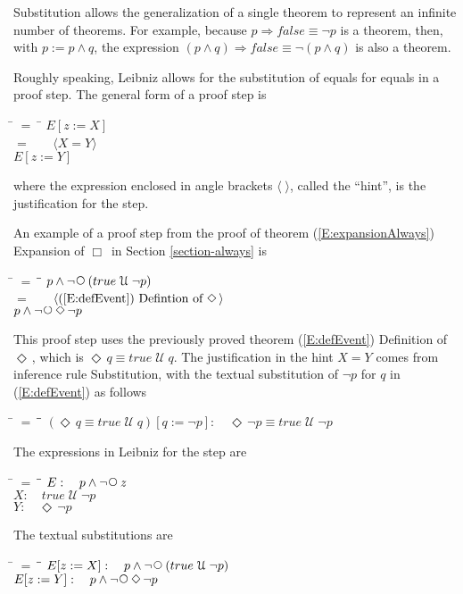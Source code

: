 \documentclass[12pt, fleqn, leqno]{article}
\newcommand{\lgap}{2pt}                             %
\newcommand{\mymathindent}{24pt}                    %
\newcommand{\impl}{\ensuremath{\Rightarrow}}        %
\newcommand{\Until}{\;\mathcal{U}\;}
\newcommand{\Next}{\;\,\text{\raisebox{3.5pt}{\circle{6}}}}
\newcommand{\Event}{\Diamond\,}
\newcommand{\Always}{\Box\,}
\newcommand{\myqedtab}{\hspace{384pt}}              %
\newcommand{\Gll} {\langle}                         %
\newcommand{\Ggg} {\rangle}                         %
\newcommand{\Hint}[1]     {\ \ \ $\Gll              \mbox{#1} \Ggg$ }   %
\begin{document}
Substitution allows the generalization of a single theorem to represent an infinite number of theorems.
For example, because $p\impl false \equiv \lnot p$ is a theorem, then, with $p:=p\land q$, the expression
$(p\land q)\impl false \equiv \lnot (p\land q)$ is also a theorem.

Roughly speaking, Leibniz allows for the substitution of equals for equals in a proof step.
The general form of a proof step is
\begin{tabbing}
\hspace{\mymathindent} \= $= \;$ \=  \kill
  \> \>   $E[z:=X]$\\[\lgap]
  \> $=$  \>  \Hint{$X=Y$} \\[\lgap]
  \> \>   $E[z:=Y]$
\end{tabbing}
where the expression enclosed in angle brackets $\Gll\;\Ggg$, called the ``hint'', is the justification for the step.

An example of a proof step from the proof of theorem (\ref{E:expansionAlways}) Expansion of $\Always$ in Section \ref{section-always} is
\begin{tabbing}
\hspace{\mymathindent} \= $= \;$ \= \myqedtab \= \kill
  \> \>   $p \land \neg\Next(true \Until \neg p)$\\[\lgap]
  \> $=$  \>  \Hint{(\ref{E:defEvent}) Defintion of $\Event$}\\[\lgap]
  \> \>   $p \land \neg\Next\Event\neg p$
\end{tabbing}
This proof step uses the previously proved theorem (\ref{E:defEvent}) Definition of $\Event$,
which is $\Event q \equiv true \Until q$.
The justification in the hint $X=Y$ comes from inference rule Substitution, with the textual substitution of $\neg p$ for $q$
in (\ref{E:defEvent}) as follows
\begin{tabbing}
\hspace{\mymathindent} \= $= \;$ \= \myqedtab \= \kill
  \> $(\Event q \equiv true \Until q)[q:=\neg p]:\quad \Event \neg p \equiv true \Until \neg p$
\end{tabbing}
The expressions in Leibniz for the step are
\begin{tabbing}
\hspace{\mymathindent} \= $= \;$ \= \myqedtab \= \kill
  \> $E:\quad p \land \neg\Next z$\\[\lgap]
  \> $X:\quad true \Until \neg p$\\[\lgap]
  \> $Y:\quad \Event \neg p$
\end{tabbing}
The textual substitutions are
\begin{tabbing}
\hspace{\mymathindent} \= $= \;$ \= \myqedtab \= \kill
  \> $E[z:=X]:\quad p \land \neg\Next(true \Until \neg p)$\\[\lgap]
  \> $E[z:=Y]:\quad p \land \neg\Next\Event\neg p$
\end{tabbing}
\end{document}
